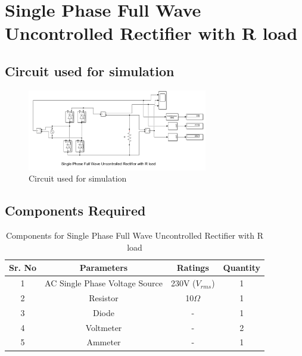 \section{Single Phase Full Wave Uncontrolled Rectifier with R
  load}

\subsection{Circuit used for simulation}

\begin{figure}[h]
    \centering
    \includegraphics[width=0.7\textwidth]{images/experiment-2/circuit-diagram-simulation-01.png}
    \caption{Circuit used for simulation}
    \label{Fig_simulation_circuit_single-phase-full-wave-uncontrolled-rectifier-with-R-load}
\end{figure}

\subsection{Components Required}

\begin{table}[h]
    \renewcommand{\arraystretch}{1.3}
    \label{table_components_required_circuit_1}
    \centering
    \begin{tabular}{|c|c|c|c|}
        \hline
        Sr. No & Parameters                     & Ratings            & Quantity \\
        \hline
        \hline
        1      & AC Single Phase Voltage Source & 230V ($ V_{rms} $) & 1        \\
        \hline
        2      & Resistor                       & 10$ \Omega $       & 1        \\
        \hline
        3      & Diode                          & -                  & 1        \\
        \hline
        4      & Voltmeter                      & -                  & 2        \\
        \hline
        5      & Ammeter                        & -                  & 1        \\
        \hline
    \end{tabular}
    \caption{Components for Single Phase Full Wave Uncontrolled Rectifier with R load}

\end{table}




